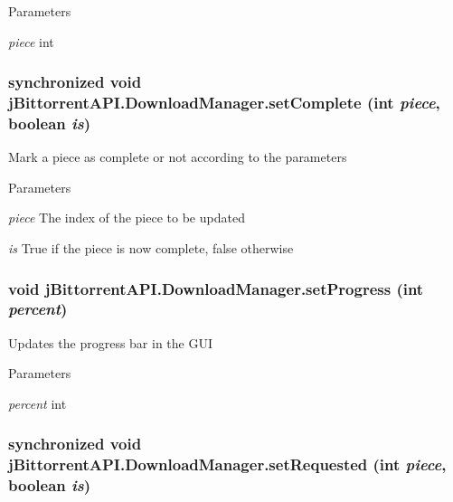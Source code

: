 \begin{DoxyParams}{Parameters}
\item[{\em piece}]int \end{DoxyParams}
\hypertarget{classj_bittorrent_a_p_i_1_1_download_manager_a77f2cb90c39d9aa0a0917c7221593496}{
\subsubsection[{setComplete}]{\setlength{\rightskip}{0pt plus 5cm}synchronized void jBittorrentAPI.DownloadManager.setComplete (int {\em piece}, \/  boolean {\em is})}}
\label{classj_bittorrent_a_p_i_1_1_download_manager_a77f2cb90c39d9aa0a0917c7221593496}
Mark a piece as complete or not according to the parameters 
\begin{DoxyParams}{Parameters}
\item[{\em piece}]The index of the piece to be updated \item[{\em is}]True if the piece is now complete, false otherwise \end{DoxyParams}
\hypertarget{classj_bittorrent_a_p_i_1_1_download_manager_a938bc914b3c42f488705aa8e6c5d0ae8}{
\subsubsection[{setProgress}]{\setlength{\rightskip}{0pt plus 5cm}void jBittorrentAPI.DownloadManager.setProgress (int {\em percent})}}
\label{classj_bittorrent_a_p_i_1_1_download_manager_a938bc914b3c42f488705aa8e6c5d0ae8}
Updates the progress bar in the GUI 
\begin{DoxyParams}{Parameters}
\item[{\em percent}]int \end{DoxyParams}
\hypertarget{classj_bittorrent_a_p_i_1_1_download_manager_a25c9eae498059d4de7b7642e5cd30498}{
\subsubsection[{setRequested}]{\setlength{\rightskip}{0pt plus 5cm}synchronized void jBittorrentAPI.DownloadManager.setRequested (int {\em piece}, \/  boolean {\em is})}}

